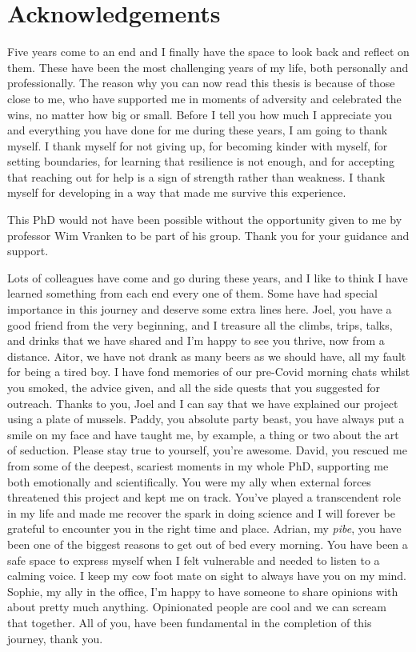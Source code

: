 \chapter*{Acknowledgements}

Five years come to an end and I finally have the space to look back and reflect on them. These have been the most challenging years of my life, both personally and professionally. The reason why you can now read this thesis is because of those close to me, who have supported me in moments of adversity and celebrated the wins, no matter how big or small. Before I tell you how much I appreciate you and everything you have done for me during these years, I am going to thank myself. I thank myself for not giving up, for becoming kinder with myself, for setting boundaries, for learning that resilience is not enough, and for accepting that reaching out for help is a sign of strength rather than weakness. I thank myself for developing in a way that made me survive this experience. 

This PhD would not have been possible without the opportunity given to me by professor Wim Vranken to be part of his group. Thank you for your guidance and support.

Lots of colleagues have come and go during these years, and I like to think I have learned something from each end every one of them. Some have had special importance in this journey and deserve some extra lines here. Joel, you have a good friend from the very beginning, and I treasure all the climbs, trips, talks, and drinks that we have shared and I'm happy to see you thrive, now from a distance. Aitor, we have not drank as many beers as we should have, all my fault for being a tired boy. I have fond memories of our pre-Covid morning chats whilst you smoked, the advice given, and all the side quests that you suggested for outreach. Thanks to you, Joel and I can say that we have explained our project using a plate of mussels. Paddy, you absolute party beast, you have always put a smile on my face and have taught me, by example, a thing or two about the art of seduction. Please stay true to yourself, you're awesome. David, you rescued me from some of the deepest, scariest moments in my whole PhD, supporting me both emotionally and scientifically. You were my ally when external forces threatened this project and kept me on track. You've played a transcendent role in my life and made me recover the spark in doing science and I will forever be grateful to encounter you in the right time and place. Adrian, my \textit{pibe}, you have been one of the biggest reasons to get out of bed every morning. You have been a safe space to express myself when I felt vulnerable and needed to listen to a calming voice. I keep my cow foot mate on sight to always have you on my mind. Sophie, my ally in the office, I'm happy to have someone to share opinions with about pretty much anything. Opinionated people are cool and we can scream that together. All of you, have been fundamental in the completion of this journey, thank you. 
